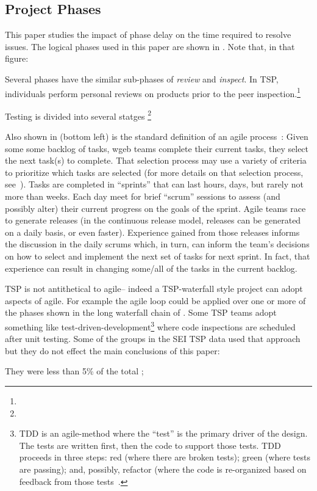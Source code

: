 \subsection{Project Phases}
This paper studies the impact of phase delay on the time required to resolve issues.
The logical phases used in this paper are shown in . Note that, in that figure:
\bi 
\item
Several  phases have the similar  sub-phases of {\em review} and {\em inspect}. In TSP, individuals perform personal reviews on products prior to the peer inspection.\footnote{}
\item Testing is divided into several statges \footnote{}
\ei 

Also shown in  (bottom left) is the standard definition of an agile process~\cite{boehmturner03}:
Given some
some backlog of tasks, wgeb teams complete their current tasks, they select the next task(s) to complete. That selection process may use a variety of criteria
to prioritize which  tasks are selected (for more details on that selection process, see~\cite{me09j,port08,boehmturner03}). Tasks are completed in ``sprints'' that can last hours,
days, but rarely not more than weeks. Each day meet for brief ``scrum'' sessions to assess (and possibly alter) their current progress on the goals of the sprint.  
Agile teams race to generate releases
(in the continuous release model, releases can be generated on a daily basis, or even faster).  
Experience gained from those releases informs the discussion in the daily scrums which, in turn,
can inform the team's decisions on how to select and implement the next set of tasks for next sprint.
In fact, that experience can result in changing some/all of the tasks in the current backlog. 

TSP is not antithetical to agile--  indeed a TSP-waterfall style project can adopt aspects
of agile.  For example the agile loop  could be applied
over one or more of the phases shown in the long waterfall chain of . Some
TSP teams adopt something like test-driven-development\footnote{TDD is an agile-method
where the ``test'' is the primary driver of the design. The tests are written first,
then the code to support those tests. TDD proceeds in three steps: red (where there
are broken tests); green (where tests are passing); and, possibly, refactor (where
the code is re-organized based on feedback from those tests~\cite{fraser03}.} where
code inspections are scheduled after unit testing. Some of the groups in the SEI TSP data used that approach but
they do not effect the main conclusions of this paper:
\bi 
\item They were less than 5\% of the total ;

